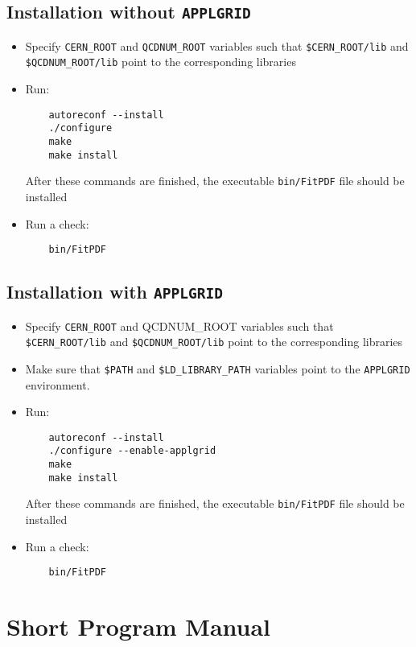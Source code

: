 \documentclass[11pt,a4paper]{article}
\begin{document}
\subsection{Installation without {\tt APPLGRID}}
\begin{itemize}
\item
 Specify {\tt CERN\_ROOT} 
     and {\tt QCDNUM\_ROOT} variables such that 
     {\tt \$CERN\_ROOT/lib}  and {\tt \$QCDNUM\_ROOT/lib}
 point to the corresponding libraries
\item Run:
\begin{verbatim}
    autoreconf --install
    ./configure
    make 
    make install
\end{verbatim}
After these commands are finished, the executable {\tt bin/FitPDF} 
file should be installed
\item  Run a check:
\begin{verbatim}
    bin/FitPDF 
\end{verbatim}
\end{itemize}

\subsection{Installation with {\tt APPLGRID}}
\begin{itemize}
\item
 Specify {\tt CERN\_ROOT} and {QCDNUM\_ROOT} variables such that 
     {\tt \$CERN\_ROOT/lib}  and {\tt \$QCDNUM\_ROOT/lib}
 point to the corresponding libraries
\item Make sure that {\tt \$PATH} and {\tt \$LD\_LIBRARY\_PATH} 
variables point to the {\tt APPLGRID} environment.
\item Run:
\begin{verbatim}
    autoreconf --install
    ./configure --enable-applgrid
    make 
    make install
\end{verbatim}
After these commands are finished, the executable {\tt bin/FitPDF} 
file should be installed
\item  Run a check:
\begin{verbatim}
    bin/FitPDF 
\end{verbatim}
\end{itemize}

\section{Short Program Manual}
\end{document}
